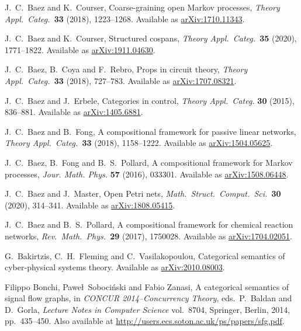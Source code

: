 \documentclass[reqno]{amsart}
\begin{document}
\begin{thebibliography}{100}

 J.\ C.\ Baez and K.\ Courser, Coarse-graining open Markov processes, \textsl{Theory Appl.\ Categ.\ }\textbf{33} (2018), 1223--1268.  Available as \href{https://arxiv.org/abs/1710.11343}{arXiv:1710.11343}.

 J.\ C.\ Baez and K.\ Courser, Structured cospans,  \textsl{Theory Appl.\ Categ.\ }\textbf{35} (2020), 1771--1822.   Available as \href{http://arxiv.org/abs/1911.04630}{arXiv:1911.04630}.

 J.\ C.\ Baez, B.\ Coya and F.\ Rebro, Props in circuit theory, \textsl{Theory Appl.\ Categ.\ }\textbf{33} (2018), 727--783.    Available as \href{https://arxiv.org/abs/1707.08321}{arXiv:1707.08321}. 

 J.\ C.\ Baez and J.\ Erbele, Categories in control, \textsl{Theory Appl.\ Categ.} {\bf 30} (2015), 836--881. Available as \href{http://arxiv.org/abs/1405.6881}{arXiv:1405.6881}.

  J.\ C.\ Baez and B.\ Fong, A compositional framework for passive linear networks, \textsl{Theory Appl.\ Categ.\ }\textbf{33} (2018), 1158--1222.  Available as \href{http://arxiv.org/abs/1504.05625}{arXiv:1504.05625}.

 J.\ C.\ Baez, B.\ Fong and B.\ S.\ Pollard, A compositional framework for Markov processes, \textsl{Jour. Math. Phys.} \textbf{57} (2016), 033301. Available as \href{http://arxiv.org/abs/1508.06448}{arXiv:1508.06448}.

  J.\ C.\ Baez and J.\ Master, Open Petri nets, \textsl{Math.\ Struct.\ Comput.\ Sci.\ }\textbf{30} (2020), 314--341. Available as 
\href{https://arxiv.org/abs/1808.05415}{arXiv:1808.05415}. 

 J.\ C.\ Baez and B.\ S.\ Pollard, A compositional framework for chemical reaction networks, \textsl{Rev.\ Math.\ Phys.\ }\textbf{29} (2017), 1750028.  Available as \href{http://arxiv.org/abs/1704.02051}{arXiv:1704.02051}.

 G.\ Bakirtzis, C.\ H.\ Fleming and C.\ Vasilakopoulou, Categorical semantics of cyber-physical systems theory. Available as 
\href{https://arxiv.org/abs/2010.08003}{arXiv:2010.08003}.

 Filippo Bonchi, Pawe\l~Soboci\'nski and Fabio Zanasi, A categorical semantics of signal flow graphs, in \textsl{CONCUR 2014--Concurrency Theory}, eds.\ P.\ Baldan and D.\ Gorla, \textsl{Lecture Notes in Computer Science} vol.\ 8704, Springer, Berlin, 2014, pp.\ 435--450.  Also available at \href{http://users.ecs.soton.ac.uk/ps/papers/sfg.pdf}{http://users.ecs.soton.ac.uk/ps/papers/sfg.pdf}.


\end{thebibliography}
\end{document}
